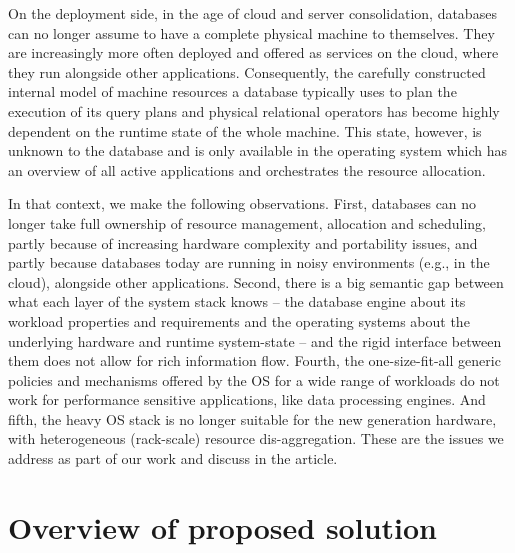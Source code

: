 \documentclass[11pt]{article}
\begin{document}
On the deployment side, in the age of cloud and server consolidation, databases can 
no longer assume to have a complete physical machine to themselves. They are 
increasingly more often deployed and offered as services on the cloud, where they
run alongside other applications. Consequently, the carefully constructed internal 
model of machine resources a database typically uses to plan the execution of its 
query plans and physical relational operators has become highly dependent on the 
runtime state of the whole machine. This state, however, is unknown to the database
and is only available in the operating system which has an overview of all 
active applications and orchestrates the resource allocation. 

In that context, we make the following observations. First, databases can no longer 
take full ownership of resource management, allocation and scheduling, partly because 
of increasing hardware complexity and portability issues, and partly because databases
today are running in noisy environments (e.g., in the cloud), alongside other applications.
Second, there is a big semantic gap between what each layer of the system stack knows --
the database engine about its workload properties and requirements and the operating 
systems about the underlying hardware and runtime system-state -- and the rigid 
interface between them does not allow for rich information flow. Fourth, the 
one-size-fit-all generic policies and mechanisms offered by the OS for a wide range 
of workloads do not work for performance sensitive applications, like data processing 
engines. And fifth, the heavy OS stack is no longer suitable for the new generation 
hardware, with heterogeneous (rack-scale) resource dis-aggregation. These are the 
issues we address as part of our work and discuss in the article.

%

\section{Overview of proposed solution}

\end{document}
